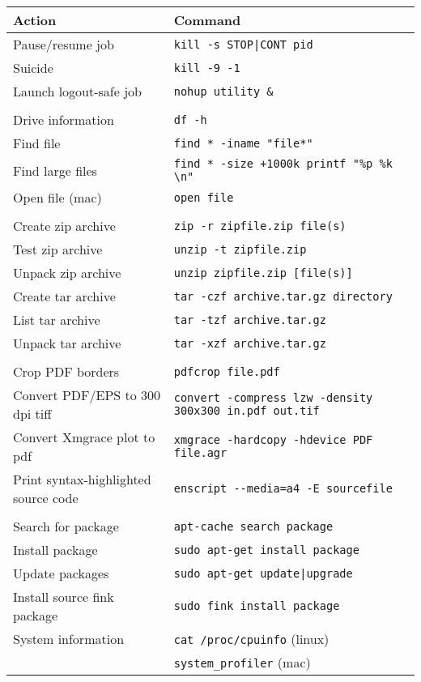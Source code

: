 \documentclass[a4paper,10pt]{article}
\begin{document}
\begin{table}
\begin{tabular}{ll}\hline\hline
Action              & Command \\\hline
Pause/resume job    & \verb"kill -s STOP|CONT pid" \\
Suicide             & \verb"kill -9 -1"\\
Launch logout-safe job  & \verb"nohup utility &" \\
\\
Drive information   & \verb"df -h"\\
Find file           & \verb'find * -iname "file*"'\\
Find large files    & \verb'find * -size +1000k printf "%p %k \n"'\\
Open file (mac)     & \verb"open file"\\
\\
Create zip archive  & \verb"zip -r zipfile.zip file(s)"\\
Test zip archive    & \verb"unzip -t zipfile.zip"\\
Unpack zip archive  & \verb"unzip zipfile.zip [file(s)]"\\
Create tar archive  & \verb"tar -czf archive.tar.gz directory"\\
List tar archive    & \verb"tar -tzf archive.tar.gz"\\
Unpack tar archive  & \verb"tar -xzf archive.tar.gz"\\
\\
Crop PDF borders & \verb"pdfcrop file.pdf" \\
Convert PDF/EPS to 300 dpi tiff & \verb"convert -compress lzw -density 300x300 in.pdf out.tif" \\
Convert Xmgrace plot to pdf     & \verb"xmgrace -hardcopy -hdevice PDF file.agr"\\
Print syntax-highlighted source code & \verb"enscript --media=a4 -E sourcefile"\\
\\
Search for package  & \verb"apt-cache search package"\\
Install package     & \verb"sudo apt-get install package"\\
Update packages     &  \verb"sudo apt-get update|upgrade"\\
Install source fink package & \verb"sudo fink install package"\\
System information  & \verb"cat /proc/cpuinfo" (linux) \\
                    & \verb"system_profiler" (mac) \\

\end{tabular}
\end{table}
\end{document}
